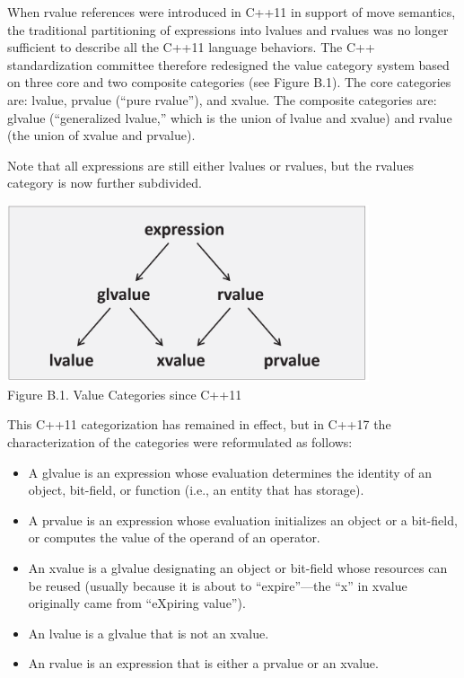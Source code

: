 
When rvalue references were introduced in C++11 in support of move semantics, the traditional partitioning of expressions into lvalues and rvalues was no longer sufficient to describe all the C++11 language behaviors. The C++ standardization committee therefore redesigned the value category system based on three core and two composite categories (see Figure B.1). The core categories are: lvalue, prvalue (“pure rvalue”), and xvalue. The composite categories are: glvalue (“generalized lvalue,” which is the union of lvalue and xvalue) and rvalue (the union of xvalue and prvalue).

Note that all expressions are still either lvalues or rvalues, but the rvalues category is now further subdivided.

\begin{center}
\includegraphics[width=0.8\textwidth]{content/Appendix/B/images/1.png} \\
Figure B.1. Value Categories since C++11
\end{center}

This C++11 categorization has remained in effect, but in C++17 the characterization of the categories were reformulated as follows:

\begin{itemize}
\item 
A glvalue is an expression whose evaluation determines the identity of an object, bit-field, or function (i.e., an entity that has storage).

\item 
A prvalue is an expression whose evaluation initializes an object or a bit-field, or computes the value of the operand of an operator.

\item 
An xvalue is a glvalue designating an object or bit-field whose resources can be reused (usually because it is about to “expire”—the “x” in xvalue originally came from “eXpiring value”).

\item 
An lvalue is a glvalue that is not an xvalue.

\item 
An rvalue is an expression that is either a prvalue or an xvalue.
\end{itemize}

